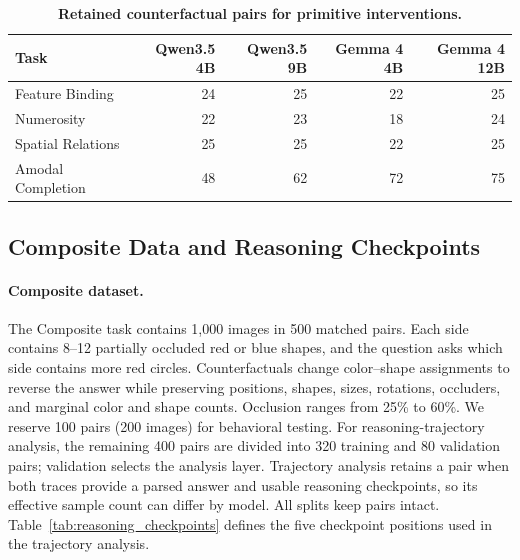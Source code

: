 \documentclass{article} %
\begin{document}
\begin{table}[H]
\centering\small
\renewcommand{\arraystretch}{1.05}
\setlength{\tabcolsep}{4pt}
\caption{\textbf{Retained counterfactual pairs for primitive interventions.}}
\label{tab:patch_retained_pairs}
\begin{tabular*}{\textwidth}{@{\extracolsep{\fill}}lrrrr@{}}
\toprule
Task & Qwen3.5 4B & Qwen3.5 9B & Gemma 4 4B & Gemma 4 12B \\
\midrule
Feature Binding & 24 & 25 & 22 & 25 \\
Numerosity & 22 & 23 & 18 & 24 \\
Spatial Relations & 25 & 25 & 22 & 25 \\
Amodal Completion & 48 & 62 & 72 & 75 \\
\bottomrule
\end{tabular*}
\end{table}

\subsection{Composite Data and Reasoning Checkpoints}
\label{app:reasoning_checkpoints}

\paragraph{Composite dataset.}
The Composite task contains 1,000 images in 500 matched pairs. Each side contains 8--12 partially occluded red or blue shapes, and the question asks which side contains more red circles. Counterfactuals change color--shape assignments to reverse the answer while preserving positions, shapes, sizes, rotations, occluders, and marginal color and shape counts. Occlusion ranges from 25\% to 60\%. We reserve 100 pairs (200 images) for behavioral testing. For reasoning-trajectory analysis, the remaining 400 pairs are divided into 320 training and 80 validation pairs; validation selects the analysis layer. Trajectory analysis retains a pair when both traces provide a parsed answer and usable reasoning checkpoints, so its effective sample count can differ by model. All splits keep pairs intact. Table~\ref{tab:reasoning_checkpoints} defines the five checkpoint positions used in the trajectory analysis.
\end{document}
